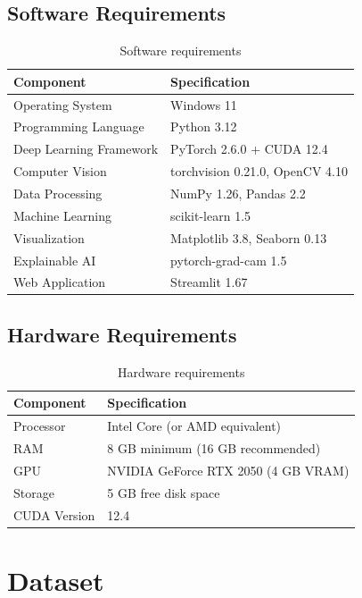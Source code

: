 \documentclass[12pt, a4paper]{article}
\begin{document}
\subsection{Software Requirements}
\begin{table}[H]
\centering
\begin{tabular}{@{}ll@{}}
\toprule
\textbf{Component} & \textbf{Specification} \\
\midrule
Operating System & Windows 11 \\
Programming Language & Python 3.12 \\
Deep Learning Framework & PyTorch 2.6.0 + CUDA 12.4 \\
Computer Vision & torchvision 0.21.0, OpenCV 4.10 \\
Data Processing & NumPy 1.26, Pandas 2.2 \\
Machine Learning & scikit-learn 1.5 \\
Visualization & Matplotlib 3.8, Seaborn 0.13 \\
Explainable AI & pytorch-grad-cam 1.5 \\
Web Application & Streamlit 1.67 \\
\bottomrule
\end{tabular}
\caption{Software requirements}
\end{table}

\subsection{Hardware Requirements}
\begin{table}[H]
\centering
\begin{tabular}{@{}ll@{}}
\toprule
\textbf{Component} & \textbf{Specification} \\
\midrule
Processor & Intel Core (or AMD equivalent) \\
RAM & 8 GB minimum (16 GB recommended) \\
GPU & NVIDIA GeForce RTX 2050 (4 GB VRAM) \\
Storage & 5 GB free disk space \\
CUDA Version & 12.4 \\
\bottomrule
\end{tabular}
\caption{Hardware requirements}
\end{table}

\section{Dataset}
\end{document}
